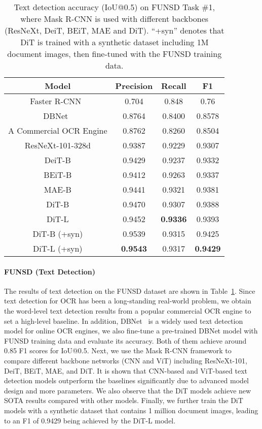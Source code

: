 \documentclass[sigconf]{acmart}
\begin{document}
\begin{table}[t]
    \centering
    \begin{tabular}{cccc}
        \toprule
        \multicolumn{1}{c}{\bf Model}  & \bf Precision & \bf Recall & \bf F1  \\
        \midrule
        Faster R-CNN~\citep{Jaume2019FUNSDAD} & 0.704 & 0.848 & 0.76 \\
        DBNet~\citep{liao2022realtime} &0.8764 &0.8400 &0.8578 \\
        A Commercial OCR Engine &0.8762 &0.8260 &0.8504\\
        \midrule
        ResNeXt-101-328d &0.9387 &0.9229 &0.9307 \\
        DeiT-B &0.9429 &0.9237 &0.9332\\
        BEiT-B &0.9412 &0.9263 &0.9337\\
        MAE-B &0.9441 &0.9321 &0.9381\\
        \midrule
        DiT-B &0.9470 &0.9307 &0.9388\\
        DiT-L &0.9452 & \bf 0.9336 &0.9393\\
        \midrule
        DiT-B (+syn) &0.9539 &0.9315 &0.9425\\
        DiT-L (+syn) &\bf 0.9543 &0.9317 & \bf 0.9429\\
\bottomrule
    \end{tabular}
    \caption{Text detection accuracy (IoU@0.5) on FUNSD Task \#1, where Mask R-CNN is used with different backbones (ResNeXt, DeiT, BEiT, MAE and DiT). ``+syn'' denotes that DiT is trained with a synthetic dataset including 1M document images, then fine-tuned with the FUNSD training data.}
    \label{tab:funsd}
\end{table}

\paragraph{FUNSD (Text Detection)}

The results of text detection on the FUNSD dataset are shown in Table~\ref{tab:funsd}. Since text detection for OCR has been a long-standing real-world problem, we obtain the word-level text detection results from a popular commercial OCR engine to set a high-level baseline. In addition, DBNet~\citep{liao2022realtime} is a widely used text detection model for online OCR engines, we also fine-tune a pre-trained DBNet model with FUNSD training data and evaluate its accuracy. Both of them achieve around 0.85 F1 scores for IoU@0.5. Next, we use the Mask R-CNN framework to compare different backbone networks (CNN and ViT) including ResNeXt-101, DeiT, BEiT, MAE, and DiT. It is shown that CNN-based and ViT-based text detection models outperform the baselines significantly due to advanced model design and more parameters. We also observe that the DiT models achieve new SOTA results compared with other models. Finally, we further train the DiT models with a synthetic dataset that contains 1 million document images, leading to an F1 of 0.9429 being achieved by the DiT-L model.
\end{document}
